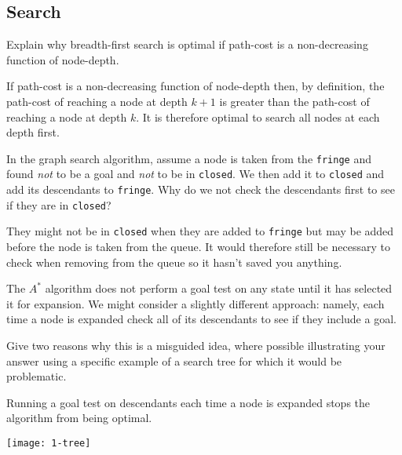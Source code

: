 \documentclass{supervision}
\begin{document}
  \begin{questions}
    \section*{Search}
    \question Explain why breadth-first search is optimal if path-cost is a
      non-decreasing function of node-depth.

      \begin{solution}
        If path-cost is a non-decreasing function of node-depth then, by
        definition, the path-cost of reaching a node at depth $k+1$ is greater
        than the path-cost of reaching a node at depth $k$. It is therefore
        optimal to search all nodes at each depth first.
      \end{solution}

    \question In the graph search algorithm, assume a node is taken from the
      \lstinline|fringe| and found \textit{not} to be a goal and \textit{not} to
      be in \lstinline|closed|. We then add it to \lstinline|closed| and add its
      descendants to \lstinline|fringe|. Why do we not check the descendants
      first to see if they are in \lstinline|closed|?

      \begin{solution}
        They might not be in \lstinline|closed| when they are added to
        \lstinline|fringe| but may be added before the node is taken from the
        queue. It would therefore still be necessary to check when removing from
        the queue so it hasn't saved you anything.
      \end{solution}

    \question The $A^*$ algorithm does not perform a goal test on any state
      until it has selected it for expansion. We might consider a slightly
      different approach: namely, each time a node is expanded check all of its
      descendants to see if they include a goal.

      Give two reasons why this is a misguided idea, where possible illustrating
      your answer using a specific example of a search tree for which it would
      be problematic.

      \begin{solution}
        Running a goal test on descendants each time a node is expanded stops
        the algorithm from being optimal.

        \begin{center}
          \texttt{[image: 1-tree]}
        \end{center}


\end{solution}
\end{questions}
\end{document}
